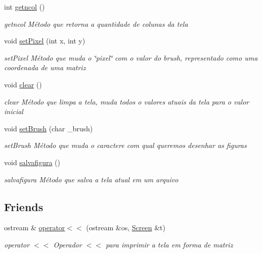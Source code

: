 \begin{DoxyCompactItemize}
int \mbox{\hyperlink{class_screen_abaae93e39587a865d4ac1f7fa1a501c2}{getncol}} ()
\begin{DoxyCompactList}\small\item\em getncol Método que retorna a quantidade de colunas da tela \end{DoxyCompactList}\item 
void \mbox{\hyperlink{class_screen_ae6bea81c57a22d226507c3c26fa95ee0}{set\+Pixel}} (int x, int y)
\begin{DoxyCompactList}\small\item\em set\+Pixel Método que muda o \char`\"{}pixel\char`\"{} com o valor do \textquotesingle{}brush\textquotesingle{}, representado como uma coordenada de uma matriz \end{DoxyCompactList}\item 
void \mbox{\hyperlink{class_screen_a35e74266b2a04e37b354ceff7a5f1031}{clear}} ()
\begin{DoxyCompactList}\small\item\em clear Método que limpa a tela, muda todos o valores atuais da tela para o valor inicial \end{DoxyCompactList}\item 
void \mbox{\hyperlink{class_screen_aebc4eb6cb5acf15a0f04c1494622ab23}{set\+Brush}} (char \+\_\+brush)
\begin{DoxyCompactList}\small\item\em set\+Brush Método que muda o caractere com qual queremos desenhar as figuras \end{DoxyCompactList}\item 
void \mbox{\hyperlink{class_screen_ad0d7ac072702d42e6a920a806fbc79e2}{salvafigura}} ()
\begin{DoxyCompactList}\small\item\em salvafigura Método que salva a tela atual em um arquivo \end{DoxyCompactList}\end{DoxyCompactItemize}
\subsection*{Friends}
\begin{DoxyCompactItemize}
\item 
ostream \& \mbox{\hyperlink{class_screen_aab6a2880746bfe1b7964817cc8f0989e}{operator$<$$<$}} (ostream \&os, \mbox{\hyperlink{class_screen}{Screen}} \&t)
\begin{DoxyCompactList}\small\item\em operator $<$$<$ Operador $<$$<$ para imprimir a tela em forma de matriz \end{DoxyCompactList}\end{DoxyCompactItemize}



